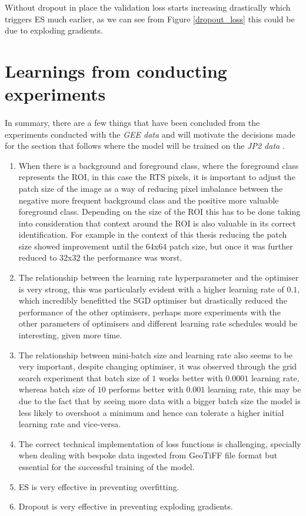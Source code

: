 Without dropout in place the validation loss starts increasing drastically which triggers \gls{ES} much earlier, as we can see from Figure \ref{dropout_loss} this could be due to exploding gradients.

\section{Learnings from conducting experiments}
\paragraph{}
In summary, there are a few things that have been concluded from the experiments conducted with the \textit{\gls{GEE} data} and will motivate the decisions made for the section that follows where the model will be trained on the \textit{\gls{JP2} data} .

\begin{enumerate}
    \item{When there is a background and foreground class, where the foreground class represents the \gls{ROI}, in this case the \gls{RTS} pixels, it is important to adjust the patch size of the image as a way of reducing pixel imbalance between the negative more frequent background class and the positive more valuable foreground class. Depending on the size of the \gls{ROI} this has to be done taking into consideration that context around the \gls{ROI} is also valuable in its correct identification. For example in the context of this thesis reducing the patch size showed improvement until the $64$x$64$ patch size, but once it was further reduced to $32$x$32$ the performance was worst.}
    \item{The relationship between the learning rate hyperparameter and the optimiser is very strong, this was particularly evident with a higher learning rate of $0.1$, which incredibly benefitted the \gls{SGD} optimiser but drastically reduced the performance of the other optimisers, perhaps more experiments with the other parameters of optimisers and different learning rate schedules would be interesting, given more time.}
    \item{The relationship between mini-batch size and learning rate also seems to be very important, despite changing optimiser, it was observed through the grid search experiment that batch size of $1$ works better with $0.0001$ learning rate, whereas batch size of $10$ performs better with $0.001$ learning rate, this may be due to the fact that by seeing more data with a bigger batch size the model is less likely to overshoot a minimum and hence can tolerate a higher initial learning rate and vice-versa.}
    \item {The correct technical implementation of loss functions is challenging, specially when dealing with bespoke data ingested from GeoTiFF file format but essential for the successful training of the model.}
    \item {\gls{ES} is very effective in preventing overfitting.}
    \item {Dropout is very effective in preventing exploding gradients.}
\end{enumerate}
